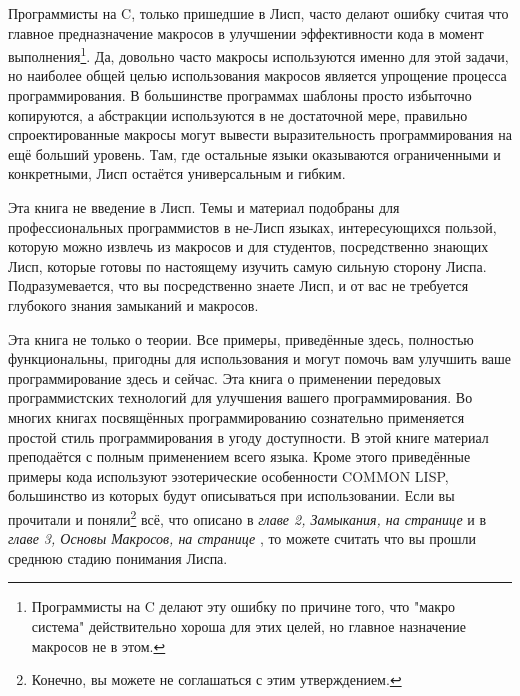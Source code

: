 Программисты на C, только пришедшие в Лисп, часто делают ошибку считая что главное предназначение макросов в улучшении эффек\-тив\-ности кода в момент выполнения\footnote{Программисты на C делают эту ошибку по причине того, что "макро система" действительно хороша для этих целей, но главное назначение макросов не в этом.}. Да, довольно часто макросы ис\-поль\-зуются именно для этой задачи, но наиболее общей целью использования макросов является упрощение процесса программирования. В боль\-шинс\-тве программах шаблоны просто избыточно копируются, а абстракции используются в не достаточной мере, правильно спроектированные мак\-ро\-сы могут вывести выразительность программирования на ещё боль\-ший уровень. Там, где остальные языки оказываются ограниченными и конкретными, Лисп остаётся универсальным и гибким.

Эта книга не введение в Лисп. Темы и материал подобраны для профессиональных программистов в не-Лисп языках, интересующихся пользой, которую можно извлечь из макросов и для студентов, пос\-редс\-твен\-но знающих Лисп, которые готовы по настоящему изучить самую сильную сторону Лиспа. Подразумевается, что вы посредственно знаете Лисп, и от вас не требуется глубокого знания замыканий и макросов.

Эта книга не только о теории. Все примеры, приведённые здесь, полностью функциональны, пригодны для использования и могут по\-мочь вам улучшить ваше программирование здесь и сейчас. Эта книга о применении передовых программистских технологий для улучшения вашего программирования. Во многих книгах посвящённых прог\-рам\-ми\-ро\-ва\-нию сознательно применяется простой стиль программирования в угоду доступности. В этой книге материал преподаётся с полным применением всего языка. Кроме этого приведённые примеры кода ис\-поль\-зуют эзотерические особенности COMMON LISP, большинство из которых будут описываться при использовании. Если вы прочитали и поняли\footnote{Конечно, вы можете не соглашаться с этим утверждением.} всё, что описано в \emph{главе 2, Замыкания, на странице \pageref{chapter_closures}} и в \emph{главе 3, Основы Макросов, на странице \pageref{chapter_macro_basics}}, то можете считать что вы прошли среднюю стадию понимания Лиспа.

